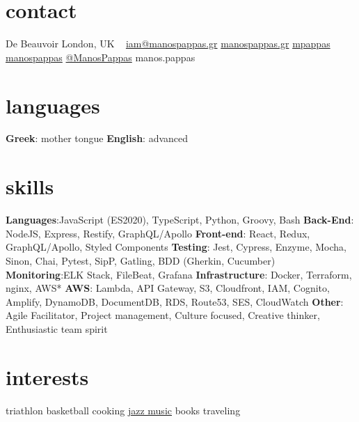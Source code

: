 
\newcommand*{\img}[1]{%
    \raisebox{-.1\baselineskip}{%
        \texttt{[image: \#1]}%
    }%
}


\begin{aside} %
\section{\normalfont contact}
\img{hackney.png} De Beauvoir
London, UK
~
\myNumberUK
\href{mailto:\myEmail}{iam@manospappas.gr}
\href{https://www.manospappas.gr/}{manospappas.gr}
 \hspace{0.02cm} \href{https://github.com/mpappas}{ mpappas}
 \hspace{0.02cm} \href{https://www.linkedin.com/in/manos-pappas}{ manospappas}
 \hspace{0.02cm} \href{https://twitter.com/ManoPappas}{ @ManosPappas}
\raisebox{-0.4ex}{\skype{}} manos.pappas
~
\vspace{-0.4cm}
\section{\normalfont languages}
\textbf{Greek}: mother tongue
\textbf{English}: advanced
~
\vspace{-0.4cm}
\section{\normalfont skills}
\textbf{Languages}:JavaScript (ES2020), TypeScript, Python, Groovy, Bash
\textbf{Back-End}: NodeJS, Express, Restify, GraphQL/Apollo
\textbf{Front-end}: React, Redux, GraphQL/Apollo, Styled Components
\textbf{Testing}: Jest, Cypress, Enzyme, Mocha, Sinon, Chai, Pytest, SipP, Gatling, BDD (Gherkin, Cucumber)
\textbf{Monitoring}:ELK Stack, FileBeat, Grafana
\textbf{Infrastructure}: Docker, Terraform, nginx, AWS*
\textbf{AWS}: Lambda, API Gateway, S3, Cloudfront, IAM, Cognito, Amplify, DynamoDB, DocumentDB, RDS, Route53, SES, CloudWatch
\textbf{Other}: Agile Facilitator, Project management, Culture focused, Creative thinker, Enthusiastic team spirit
~
\vspace{-0.4cm}
\section{\normalfont interests}
triathlon
basketball
cooking
\href{https://open.spotify.com/playlist/3FU39afuJQ9EGzF7SDDUQ8?si=0TY3q524RxW042HSjm-bhQ}{jazz music}
books
traveling
~
\end{aside}

